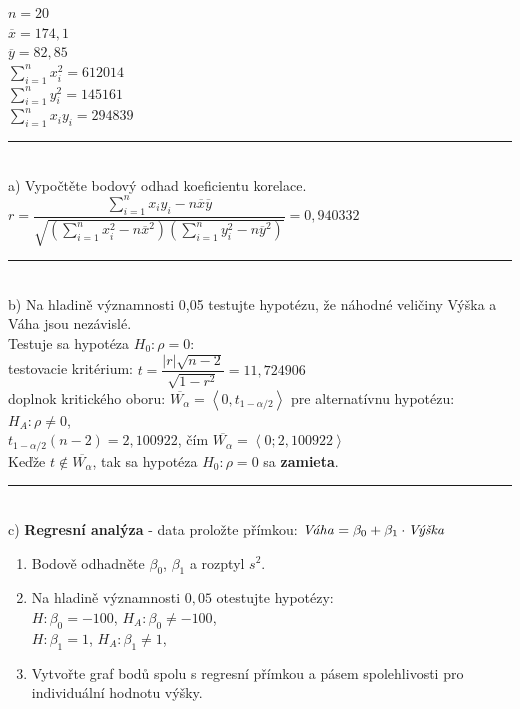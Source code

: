 \documentclass[pdftex, 11pt, a4paper, titlepage]{article}
\begin{document}
    \noindent
    $n = 20$\\
    $\overline{x} = 174,1$\\
    $\overline{y} = 82,85$\\
    $\sum\limits_{i=1}^{n}x_i^2 = 612014$\\
    $\sum\limits_{i=1}^{n}y_i^2 = 145161$\\
    $\sum\limits_{i=1}^{n}x_iy_i = 294839$\\

    \noindent\rule{\linewidth}{0.4pt}\\

    \noindent
    a) Vypočtěte bodový odhad koeficientu korelace.\\
    
    \noindent
    $r = \dfrac{\sum\limits_{i=1}^{n}x_iy_i - n\overline{x}\overline{y}}{\sqrt{\left( \sum\limits_{i=1}^{n}x_i^2 - n\overline{x}^2 \right) \left( \sum\limits_{i=1}^{n}y_i^2 - n\overline{y}^2 \right)}} = 0,940332$\\

    \noindent\rule{\linewidth}{0.4pt}\\

    \noindent
    b) Na hladině významnosti 0,05 testujte hypotézu, že náhodné veličiny
    Výška a Váha jsou nezávislé.\\

    \noindent
    Testuje sa hypotéza $H_0 : \rho = 0$:\\
    testovacie kritérium: $t = \dfrac{|r|\sqrt{n-2}}{\sqrt{1-r^2}} = 11,724906$\\
    doplnok kritického oboru: $\overline{W_\alpha} = \left\langle 0,t_{1-\alpha/2} \right\rangle$ pre alternatívnu hypotézu: $H_A: \rho \neq 0$,\\
    $t_{1-\alpha/2}(n-2) = 2,100922$, čím $\overline{W_\alpha} = \left\langle 0;2,100922 \right\rangle$\\
    Keďže $t \notin \overline{W_\alpha}$, tak sa hypotéza $H_0 : \rho = 0$ sa \textbf{zamieta}.\\

    \noindent\rule{\linewidth}{0.4pt}\\

    \noindent
    c) \textbf{Regresní analýza} - data proložte přímkou: $\text{\emph{Váha}} = \beta_0 + \beta_1\cdot\text{\emph{Výška}}$
    \begin{enumerate}
        \item Bodově odhadněte $\beta_0$, $\beta_1$ a rozptyl $s^2$.
        \item Na hladině významnosti $0,05$ otestujte hypotézy:\\
            $H : \beta_0 = -100$, $H_A : \beta_0 \neq -100$,\\
            $H : \beta_1 = 1$, $H_A : \beta_1 \neq 1$,
        \item Vytvořte graf bodů spolu s regresní přímkou a pásem spolehlivosti pro individuální hodnotu výšky.\\
    \end{enumerate}
\end{document}
